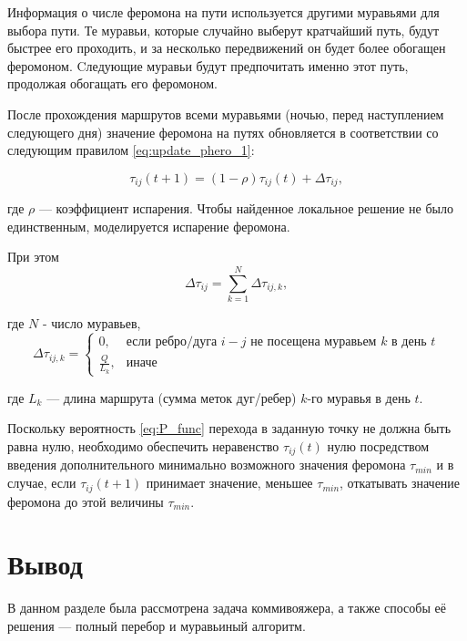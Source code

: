 Информация о числе феромона на пути используется другими муравьями для выбора пути. 
Те муравьи, которые случайно выберут кратчайший путь, будут быстрее его проходить, и за несколько передвижений он будет более обогащен феромоном. 
Cледующие муравьи будут предпочитать именно этот путь, продолжая обогащать его феромоном. 

После прохождения маршрутов всеми муравьями (ночью, перед наступлением следующего дня) значение феромона на путях обновляется в соответствии со следующим правилом \eqref{eq:update_phero_1}:

\begin{equation}
	\label{eq:update_phero_1}
	\tau_{ij}(t+1) = (1-\rho)\tau_{ij}(t) + \Delta \tau_{ij},
\end{equation}

где $\rho$ --- коэффициент испарения. 
Чтобы найденное локальное решение не было единственным, моделируется испарение феромона.

При этом
\begin{equation}
	\label{update_phero_2}
	\Delta \tau_{ij} = \sum_{k=1}^N \Delta\tau_{ij, k},
\end{equation}

где $N$ - число муравьев,
\begin{equation}
	\label{update_phero_3}
	\Delta\tau_{ij,k} = 
	\begin{cases}
		0,  & \textrm{если ребро/дуга $i-j$ не посещена муравьем $k$ в день $t$} \\
		\frac{Q}{L_{k}}, & \textrm{иначе} 
	\end{cases}
\end{equation}

где $L_{k}$ --- длина маршрута (сумма меток дуг/ребер) $k$-го муравья в день $t$.

Поскольку вероятность \ref{eq:P_func} перехода в заданную точку не должна быть равна нулю, необходимо обеспечить неравенство $\tau_{ij}(t)$ нулю посредством введения дополнительного минимально возможного значения феромона $\tau_{min}$  и в случае, если $\tau_{ij}(t+1)$ принимает значение, меньшее $\tau_{min}$, откатывать значение феромона до этой величины $\tau_{min}$.

\section*{Вывод}

В данном разделе была рассмотрена задача коммивояжера, а также способы её решения — полный перебор и муравьиный алгоритм.
